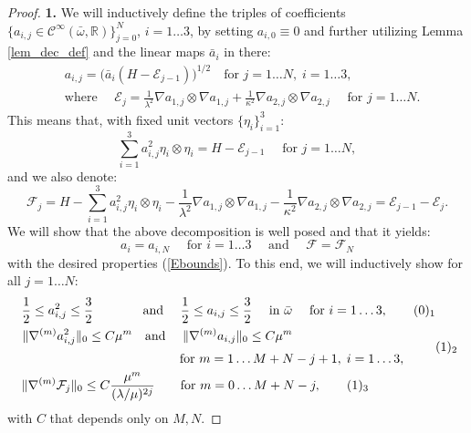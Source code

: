 \documentclass[reqno,twoside,11pt]{amsart}
\newcommand{\R}{\mathbb{R}}
\numberwithin{equation}{section}
\theoremstyle{plain}
\theoremstyle{definition}
\begin{document}
\begin{proof}
{\bf 1. }  We will inductively define the triples of 
coefficients $\{a_{i,j}\in\mathcal{C}^\infty(\bar\omega,
\R)\}_{j=0}^N$, $i=1\ldots 3$, by setting $a_{i,0}\equiv 0$ and
further utilizing Lemma \ref{lem_dec_def} and the linear maps $\bar a_i$ in there:
\begin{equation}\label{def_aP}
\begin{split}
& a_{i,j}= \big(\bar a_i(H-\mathcal{E}_{j-1})\big)^{1/2} \quad \mbox{
  for } j=1\ldots N,\; i=1\ldots 3,\\ 
&\mbox{where } \quad \mathcal{E}_j = \frac{1}{\lambda^2}\nabla a_{1,j}\otimes\nabla a_{1,j}
+ \frac{1}{\kappa^2}\nabla a_{2,j}\otimes\nabla a_{2,j}
\quad \mbox{ for } j=1 \ldots N.
\end{split}
\end{equation}
This means that, with fixed unit vectors $\{\eta_i\}_{i=1}^3$:
$$\sum_{i=1}^3a_{i,j}^2\eta_i\otimes\eta_i = H-\mathcal{E}_{j-1} \quad \mbox{ for } j=1 \ldots N,$$
and we also denote:
$$\mathcal{F}_j = H- \sum_{i=1}^3a_{i,j}^2\eta_i\otimes\eta_i -
\frac{1}{\lambda^2}\nabla a_{1,j}\otimes\nabla a_{1,j} 
- \frac{1}{\kappa^2}\nabla a_{2,j}\otimes\nabla a_{2,j} = \mathcal{E}_{j-1}-\mathcal{E}_j.$$
We will show that the above decomposition is well posed and that it yields:
\begin{equation}\label{asm4}
a_i = a_{i, N} \quad\mbox{ for } i=1\ldots 3 \quad \mbox{ and }\quad
\mathcal{F}=\mathcal{F}_N
\end{equation}
with the desired properties (\ref{Ebounds}). To this end, we will inductively show for all $j=1\ldots N$:
\begin{align*}
& \; \, \frac{1}{2}\leq a_{i,j}^2\leq \frac{3}{2} \; \; \quad \qquad
\mbox{ and }\quad 
\frac{1}{2}\leq a_{i,j}\leq \frac{3}{2} \quad\mbox{ in }\bar\omega \quad \mbox{
for } i=1\ldots 3,
\tag*{(\theequation)$_1$}\refstepcounter{equation} \label{Ebound12}\\
& \begin{array}{ll} \displaystyle{\|\nabla^{(m)} a_{i,j}^2\|_0\leq C\mu^m\quad 
\mbox{and } \quad \|\nabla^{(m)} a_{i,j}\|_0\leq C\mu^m } \vspace{2mm }\\ 
\qquad \qquad\qquad\qquad \qquad\qquad 
\mbox{ for } m=1\ldots M+N-j+1,\;  i=1\ldots 3, \end{array}
\tag*{(\theequation)$_2$}\label{Ebound22} \\ 
& \; \, \|\nabla^{(m)}\mathcal{F}_j\|_0\leq
C\frac{\mu^m}{(\lambda/\mu)^{2j}} \qquad\mbox{for } m=0\ldots M
+ N-j, \tag*{(\theequation)$_3$} \label{Ebound32}
\end{align*}
with $C$ that depends only on $M,N$.


\end{proof}
\end{document}
